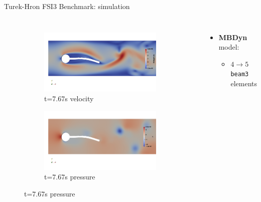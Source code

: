 \documentclass[10pt,t]{beamer}
\begin{document}
\begin{frame}{Turek-Hron FSI3 Benchmark: simulation}
\begin{columns}
\begin{figure}[htb]
\begin{subfigure}{0.5\textwidth}
  \includegraphics[width=\linewidth, trim=0 120 0 120, clip]{images/FSI3/fsi3_v3.png}
  \caption{t=7.67s velocity}
  \label{fig:fsi3_v3}
\end{subfigure}\hfil %
\begin{subfigure}{0.5\textwidth}
  \includegraphics[width=\linewidth, trim=0 120 0 120, clip]{images/FSI3/fsi3_p3.png}
  \caption{t=7.67s pressure}
  \label{fig:fsi3_p3}
\end{subfigure}\hfil %

\label{fig:FSI3_sol}
\end{figure}


\footnotesize
\begin{itemize}
    \footnotesize
    \itemsep 10pt
    \item \textbf{MBDyn} model:
    \begin{itemize}
        \item $4 \to 5$ \texttt{beam3} elements 
    \end{itemize}
    

\end{itemize}
\end{columns}
\end{frame}
\end{document}

